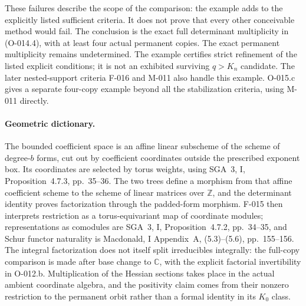 These failures describe the scope of the comparison: the
example adds to the explicitly listed sufficient criteria.
It does not prove that every other conceivable method would
fail. The conclusion is the exact full determinant multiplicity
in (O-014.4), with at least four actual permanent copies.
The exact permanent multiplicity remains undetermined.
The example certifies strict refinement of the listed explicit
conditions; it is not an exhibited surviving $q>K_n$ candidate.
The later nested-support criteria F-016 and M-011 also handle
this example. O-015.c gives a separate four-copy example
beyond all the stabilization criteria, using M-011 directly.

\paragraph{Geometric dictionary.}
The bounded coefficient space is an affine linear subscheme
of the scheme of degree-$b$ forms, cut out by coefficient
coordinates outside the prescribed exponent box. Its coordinates
are selected by torus weights, using SGA~3, I, Proposition~4.7.3,
pp.~35--36. The two trees define a morphism from that affine
coefficient scheme to the scheme of linear matrices over
$\mathbb Z$, and the determinant identity proves factorization
through the padded-form morphism. F-015 then interprets
restriction as a torus-equivariant map of coordinate modules;
representations as comodules are SGA~3, I, Proposition~4.7.2,
pp.~34--35, and Schur functor naturality is Macdonald,
I Appendix~A, (5.3)--(5.6), pp.~155--156. The integral
factorization does not itself split irreducibles integrally:
the full-copy comparison is made after base change to
$\mathbb C$, with the explicit factorial invertibility in
O-012.b. Multiplication of the Hessian sections takes place
in the actual ambient coordinate algebra, and the positivity
claim comes from their nonzero restriction to the permanent
orbit rather than a formal identity in its $K_0$ class.
